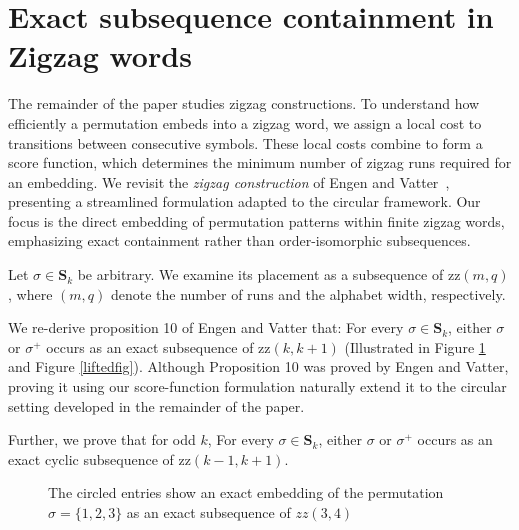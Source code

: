 \documentclass[a4paper,12pt]{article}
\theoremstyle{definition}
\numberwithin{equation}{section}
\begin{document}
\section{Exact subsequence containment in Zigzag words}\label{zigzagpattern}
The remainder of the paper studies zigzag constructions. To understand how efficiently a permutation embeds into a zigzag word, we assign a local cost to transitions between consecutive symbols. These local costs combine to form a score function, which determines the minimum number of zigzag runs required for an embedding.
We revisit the \emph{zigzag construction} of Engen and Vatter~\cite[Prop.~10]{engen2020containing}, presenting a streamlined formulation adapted to the circular framework.  
Our focus is the direct embedding of permutation patterns within finite zigzag words, emphasizing exact containment rather than order-isomorphic subsequences.

Let $\sigma \in \mathbf{S}_k$ be arbitrary.  
We examine its placement as a subsequence of $\mathrm{zz}(m,q)$, where $(m,q)$ denote the number of runs and the alphabet width, respectively. \par 
We re-derive proposition 10 of Engen and Vatter that: For every $\sigma \in \mathbf{S}_k$, either $\sigma$ or $\sigma^+$ occurs as an exact subsequence of  $\mathrm{zz}(k,k+1)$  (Illustrated in Figure \ref{exactlyfig} and Figure \ref{liftedfig}). Although Proposition 10 was proved by Engen and Vatter, proving it using our score-function formulation naturally extend it to the circular setting developed in the remainder of the paper.

Further, we prove that for odd $k$, For every $\sigma \in \mathbf{S}_k$, either $\sigma$ or $\sigma^+$ occurs as an exact cyclic subsequence of  $\mathrm{zz}(k-1,k+1)$.
\readlist{}
\readlist{}

\begin{figure}[H]
\centering
{}
\caption{ The circled entries show an exact embedding of the permutation $\sigma = \{ 1,2,3 \}$  as an exact subsequence of $zz(3,4)$}\label{exactlyfig}
\end{figure}
\end{document}
